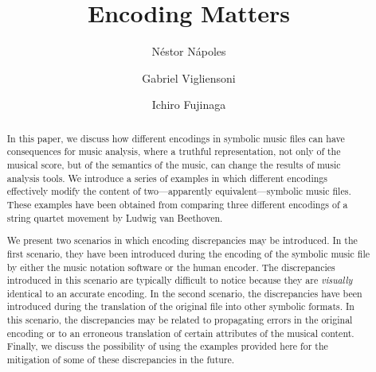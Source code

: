 \documentclass[sigconf]{acmart}
\begin{document}
\title{Encoding Matters}

\author{N\'estor N\'apoles}

\author{Gabriel Vigliensoni}

\author{Ichiro Fujinaga}



\begin{abstract}
In this paper, we discuss how different encodings in symbolic music files can have consequences for music analysis, where a truthful representation, not only of the musical score, but of the semantics of the music, can change the results of music analysis tools. We introduce a series of examples in which different encodings effectively modify the content of two---apparently equivalent---symbolic music files. These examples have been obtained from comparing three different encodings of a string quartet movement by Ludwig van Beethoven.

We present two scenarios in which encoding discrepancies may be introduced. In the first scenario, they have been introduced during the encoding of the symbolic music file by either the music notation software or the human encoder. The discrepancies introduced in this scenario are typically difficult to notice because they are \emph{visually} identical to an accurate encoding. In the second scenario, the discrepancies have been introduced during the translation of the original file into other symbolic formats. In this scenario, the discrepancies may be related to propagating errors in the original encoding or to an erroneous translation of certain attributes of the musical content. Finally, we discuss the possibility of using the examples provided here for the mitigation of some of these discrepancies in the future.
\end{abstract}
\end{document}
